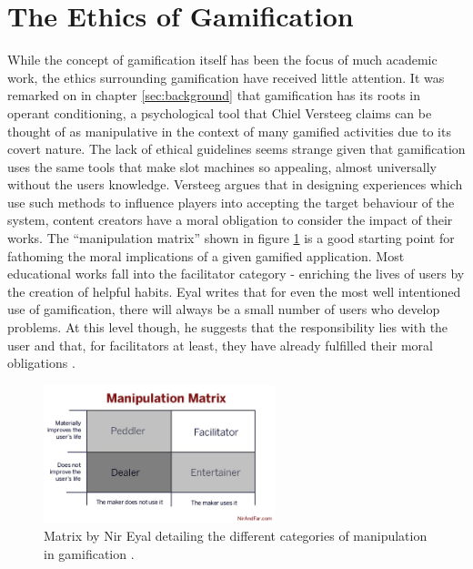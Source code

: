 \documentclass[12pt,a4paper,twoside]{report}
\begin{document}
\section{The Ethics of Gamification}
While the concept of gamification itself has been the focus of much academic work, the ethics surrounding gamification have received little attention. It was remarked on in chapter \ref{sec:background} that gamification has its roots in operant conditioning, a psychological tool that Chiel Versteeg claims \cite{versteeg2013ethics} can be thought of as manipulative in the context of many gamified activities due to its covert nature. The lack of ethical guidelines seems strange given that gamification uses the same tools that make slot machines so appealing, almost universally without the users knowledge. Versteeg argues that in designing experiences which use such methods to influence players into accepting the target behaviour of the system, content creators have a moral obligation to consider the impact of their works. The ``manipulation matrix'' shown in figure \ref{matrix} is a good starting point for fathoming the moral implications of a given gamified application. Most educational works fall into the facilitator category - enriching the lives of users by the creation of helpful habits. Eyal writes that for even the most well intentioned use of gamification, there will always be a small number of users who develop problems. At this level though, he suggests that the responsibility lies with the user and that, for facilitators at least, they have already fulfilled their moral obligations \cite{Eyal2013}.

\begin{figure}
	\begin{center}
		\includegraphics[width=0.6\textwidth]{../img/matrix.jpg}
		\caption{Matrix by Nir Eyal detailing the different categories of manipulation in gamification \cite{Eyal2013}.}
		\label{matrix}
	\end{center}
\end{figure}
\end{document}
